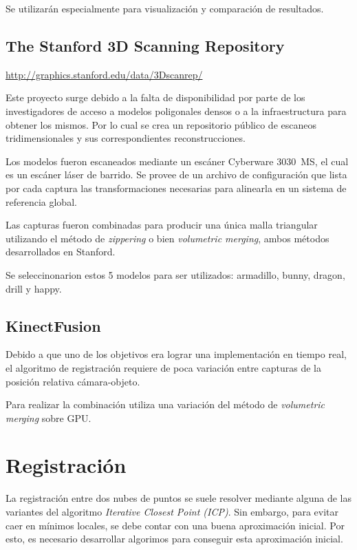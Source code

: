 \documentclass{pfc}
\begin{document}
			Se utilizarán especialmente para visualización
			y comparación de resultados.

		\subsection{The Stanford 3D Scanning Repository}
			\url{http://graphics.stanford.edu/data/3Dscanrep/}

			Este proyecto surge debido a la falta de disponibilidad
			por parte de los investigadores
			de acceso a modelos poligonales densos
				o a la infraestructura para obtener los mismos.
			Por lo cual se crea un repositorio público de
			escaneos tridimensionales y sus correspondientes reconstrucciones.

			Los modelos fueron escaneados mediante un escáner Cyberware 3030~MS,
			el cual es un escáner láser de barrido.
			Se provee de un archivo de configuración que lista por cada captura
			las transformaciones necesarias para alinearla en un sistema de
			referencia global.

			Las capturas fueron combinadas para producir una única malla
			triangular utilizando el método de \emph{zippering} o bien
			\emph{volumetric merging}, ambos métodos desarrollados en Stanford.


			Se seleccinonarion estos 5 modelos para ser utilizados: armadillo, bunny, dragon, drill y happy.

		\subsection{KinectFusion}
			Debido a que uno de los objetivos era lograr
			una implementación en tiempo real,
			el algoritmo de registración requiere de
			poca variación entre capturas de
			la posición relativa cámara-objeto.

			Para realizar la combinación utiliza una variación del método de
			\emph{volumetric merging} sobre GPU.

	\section{Registración}
		La registración entre dos nubes de puntos se suele resolver mediante
		alguna de las variantes del algoritmo \emph{Iterative Closest Point (ICP)}. 
		Sin embargo, para evitar caer en mínimos locales,
		se debe contar con una buena aproximación inicial.
		Por esto, es necesario desarrollar algorimos para conseguir esta
		aproximación inicial.
\end{document}

